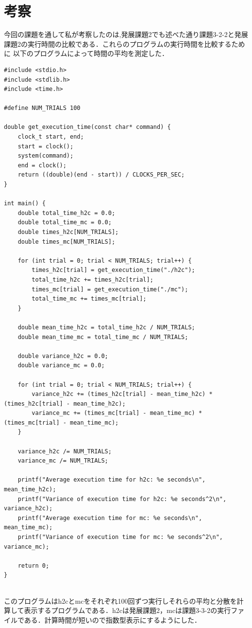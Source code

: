 \documentclass[dvipdfmx]{jarticle}
\begin{document}
\section{考察}
今回の課題を通して私が考察したのは,発展課題2でも述べた通り課題3-2-2と発展課題2の実行時間の比較である．これらのプログラムの実行時間を比較するために
以下のプログラムによって時間の平均を測定した．
\begin{lstlisting}
#include <stdio.h>
#include <stdlib.h>
#include <time.h>

#define NUM_TRIALS 100

double get_execution_time(const char* command) {
    clock_t start, end;
    start = clock();
    system(command);
    end = clock();
    return ((double)(end - start)) / CLOCKS_PER_SEC;
}

int main() {
    double total_time_h2c = 0.0;
    double total_time_mc = 0.0;
    double times_h2c[NUM_TRIALS];
    double times_mc[NUM_TRIALS];

    for (int trial = 0; trial < NUM_TRIALS; trial++) {
        times_h2c[trial] = get_execution_time("./h2c");
        total_time_h2c += times_h2c[trial];
        times_mc[trial] = get_execution_time("./mc");
        total_time_mc += times_mc[trial];
    }

    double mean_time_h2c = total_time_h2c / NUM_TRIALS;
    double mean_time_mc = total_time_mc / NUM_TRIALS;

    double variance_h2c = 0.0;
    double variance_mc = 0.0;

    for (int trial = 0; trial < NUM_TRIALS; trial++) {
        variance_h2c += (times_h2c[trial] - mean_time_h2c) * (times_h2c[trial] - mean_time_h2c);
        variance_mc += (times_mc[trial] - mean_time_mc) * (times_mc[trial] - mean_time_mc);
    }

    variance_h2c /= NUM_TRIALS;
    variance_mc /= NUM_TRIALS;

    printf("Average execution time for h2c: %e seconds\n", mean_time_h2c);
    printf("Variance of execution time for h2c: %e seconds^2\n", variance_h2c);
    printf("Average execution time for mc: %e seconds\n", mean_time_mc);
    printf("Variance of execution time for mc: %e seconds^2\n", variance_mc);

    return 0;
}
    
\end{lstlisting}
このプログラムはh2cとmcをそれぞれ100回ずつ実行しそれらの平均と分散を計算して表示するプログラムである．h2cは発展課題2，mcは課題3-3-2の実行ファイルである．計算時間が短いので指数型表示にするようにした．
\end{document}
